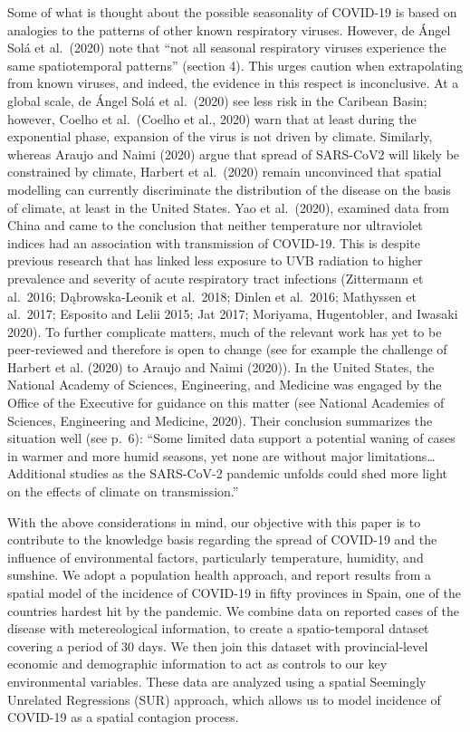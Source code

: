 \documentclass[]{elsarticle} %
\begin{document}
Some of what is thought about the possible seasonality of COVID-19 is
based on analogies to the patterns of other known respiratory viruses.
However, de Ángel Solá et al.~(2020) note that ``not all seasonal
respiratory viruses experience the same spatiotemporal patterns''
(section 4). This urges caution when extrapolating from known viruses,
and indeed, the evidence in this respect is inconclusive. At a global
scale, de Ángel Solá et al.~(2020) see less risk in the Caribean Basin;
however, Coelho et al.~(Coelho et al., 2020) warn that at least during
the exponential phase, expansion of the virus is not driven by climate.
Similarly, whereas Araujo and Naimi (2020) argue that spread of
SARS-CoV2 will likely be constrained by climate, Harbert et al.~(2020)
remain unconvinced that spatial modelling can currently discriminate the
distribution of the disease on the basis of climate, at least in the
United States. Yao et al.~(2020), examined data from China and came to
the conclusion that neither temperature nor ultraviolet indices had an
association with transmission of COVID-19. This is despite previous
research that has linked less exposure to UVB radiation to higher
prevalence and severity of acute respiratory tract infections
(Zittermann et al.~2016; Dąbrowska-Leonik et al.~2018; Dinlen et
al.~2016; Mathyssen et al.~2017; Esposito and Lelii 2015; Jat 2017;
Moriyama, Hugentobler, and Iwasaki 2020). To further complicate matters,
much of the relevant work has yet to be peer-reviewed and therefore is
open to change (see for example the challenge of Harbert et al. (2020)
to Araujo and Naimi (2020)). In the United States, the National Academy
of Sciences, Engineering, and Medicine was engaged by the Office of the
Executive for guidance on this matter (see National Academies of
Sciences, Engineering and Medicine, 2020). Their conclusion summarizes
the situation well (see p.~6): ``Some limited data support a potential
waning of cases in warmer and more humid seasons, yet none are without
major limitations\ldots{}Additional studies as the SARS-CoV-2 pandemic
unfolds could shed more light on the effects of climate on
transmission.''

With the above considerations in mind, our objective with this paper is
to contribute to the knowledge basis regarding the spread of COVID-19
and the influence of environmental factors, particularly temperature,
humidity, and sunshine. We adopt a population health approach, and
report results from a spatial model of the incidence of COVID-19 in
fifty provinces in Spain, one of the countries hardest hit by the
pandemic. We combine data on reported cases of the disease with
metereological information, to create a spatio-temporal dataset covering
a period of 30 days. We then join this dataset with provincial-level
economic and demographic information to act as controls to our key
environmental variables. These data are analyzed using a spatial
Seemingly Unrelated Regressions (SUR) approach, which allows us to model
incidence of COVID-19 as a spatial contagion process.
\end{document}
